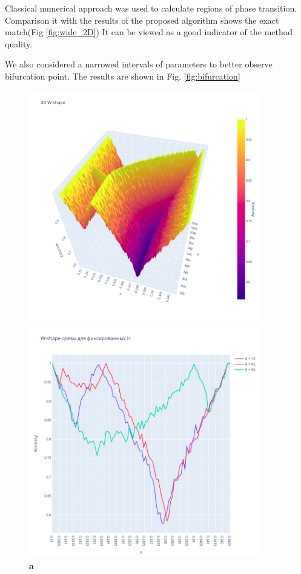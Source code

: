 Classical numerical approach was used to calculate regions of phase transition.
Comparison it with the results of the proposed algorithm shows the exact match(Fig \ref{fig:wide_2D})
It can be viewed as a good indicator of the method quality.

We also considered a narrowed intervals of parameters to better observe bifurcation point.
The results are shown in Fig. \ref{fig:bifurcation}

\begin{figure}[h]
    \centering
    \begin{minipage}{0.45\textwidth}
        \centering
        \includegraphics[width=0.9\textwidth]{../fig/bifurcation_3D.png} %
        \caption*{\textbf{a}}
        \label{fig:narrow_3D}
    \end{minipage}\hfill
    \begin{minipage}{0.45\textwidth}
        \centering
        \includegraphics[width=0.9\textwidth]{../fig/bifurcation_slices.png} %

\end{minipage}
\end{figure}
